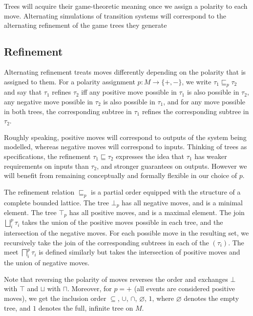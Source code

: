 \documentclass[11pt]{article}
\begin{document}
Trees will acquire their game-theoretic meaning
once we assign a polarity to each move.
Alternating simulations of transition systems
will correspond to the alternating refinement of
the game trees they generate

\subsection{Refinement}

Alternating refinement treats moves differently depending on
the polarity that is assigned to them.
For a polarity assignment $p : M \rightarrow \{ {+}, {-} \}$, we
write $\tau_1 \sqsubseteq_p \tau_2$ and
say that $\tau_1$ refines $\tau_2$ iff
any positive move possible in $\tau_1$
is also possible in $\tau_2$,
any negative move possible in $\tau_2$
is also possible in $\tau_1$,
and for any move possible in both trees,
the corresponding subtree in $\tau_1$ refines
the corresponding subtree in $\tau_2$.

Roughly speaking,
positive moves will correspond to outputs of the system being modelled,
whereas negative moves will correspond to inputs.
Thinking of trees as specifications,
the refinement $\tau_1 \sqsubseteq \tau_2$
expresses the idea that
$\tau_1$ has weaker requirements on inputs than $\tau_2$,
and stronger guarantees on outputs.
However we will benefit from
remaining conceptually and formally flexible
in our choice of $p$.

The refinement relation $\sqsubseteq_p$ is a partial order
equipped with the structure of a complete bounded lattice.
The tree $\bot_p$ has all negative moves, and is a minimal element.
The tree $\top_p$ has all positive moves, and is a maximal element.
The join $\bigsqcup^p_i \tau_i$ takes
the union of the positive moves possible in each tree,
and the intersection of the negative moves.
For each possible move in the resulting set,
we recursively take the join of the corresponding subtrees in each of the $(\tau_i)$.
The meet $\bigsqcap^p_i \tau_i$ is defined similarly but takes
the intersection of positive moves and
the union of negative moves.

Note that reversing the polarity of moves
reverses the order and
exchanges $\bot$ with $\top$ and $\sqcup$ with $\sqcap$.
Moreover, for $p = +$ (all events are considered positive moves),
we get the inclusion order
$\subseteq$, $\cup$, $\cap$, $\varnothing$, $1$, where
$\varnothing$ denotes the empty tree, and
$1$ denotes the full, infinite tree on $M$.
\end{document}
